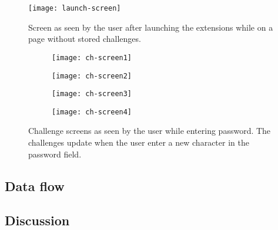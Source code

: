 \begin{figure}[h]
    \centering
    \texttt{[image: launch-screen]} 
    \caption{Screen as seen by the user after launching the extensions while on a page without stored challenges.}
    \label{launch-screen}
\end{figure}

\begin{figure}[h]
    \centering
    \begin{subfigure}[t]{0.45\textwidth}
        \centering
        \texttt{[image: ch-screen1]} 
        \caption{}
        \label{challenge-screen1}
    \end{subfigure}
    \hfill
    \begin{subfigure}[t]{0.45\textwidth}
        \centering
        \texttt{[image: ch-screen2]} 
        \caption{}
        \label{challenge-screen2}
    \end{subfigure}
    \hfill
    \begin{subfigure}[t]{0.45\textwidth}
        \centering
        \texttt{[image: ch-screen3]} 
        \caption{}
        \label{challenge-screen2}
    \end{subfigure}
    \hfill
    \begin{subfigure}[t]{0.45\textwidth}
        \centering
        \texttt{[image: ch-screen4]} 
        \caption{}
        \label{challenge-screen2}
    \end{subfigure}
    \caption{Challenge screens as seen by the user while entering password. The challenges update when the user enter a new character in the password field.}
    \label{ch-screens}
\end{figure}


\subsection{Data flow}\label{data-flow}

\subsection{Discussion}







